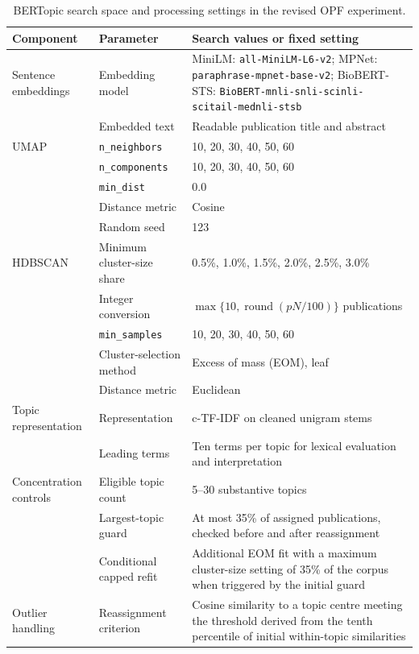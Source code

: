 \documentclass[a4paper,fleqn]{cas-sc}
\begin{document}
\begin{table}[htbp]
\centering
\caption{BERTopic search space and processing settings in the revised OPF experiment.}
\label{tab:opf_bertopic_parameters}
\scriptsize
\setlength{\tabcolsep}{4pt}
\renewcommand{\arraystretch}{1.15}
\begin{tabularx}{\textwidth}{p{27mm}p{38mm}X}
\toprule
Component & Parameter & Search values or fixed setting \\
\midrule
Sentence embeddings & Embedding model & MiniLM: \texttt{all-MiniLM-L6-v2}; MPNet: \texttt{paraphrase-mpnet-base-v2}; BioBERT-STS: \texttt{BioBERT-mnli-snli-scinli-scitail-mednli-stsb} \\
& Embedded text & Readable publication title and abstract \\
\midrule
UMAP & \texttt{n\_neighbors} & 10, 20, 30, 40, 50, 60 \\
& \texttt{n\_components} & 10, 20, 30, 40, 50, 60 \\
& \texttt{min\_dist} & 0.0 \\
& Distance metric & Cosine \\
& Random seed & 123 \\
\midrule
HDBSCAN & Minimum cluster-size share & 0.5\%, 1.0\%, 1.5\%, 2.0\%, 2.5\%, 3.0\% \\
& Integer conversion & $\max\{10,\operatorname{round}(pN/100)\}$ publications \\
& \texttt{min\_samples} & 10, 20, 30, 40, 50, 60 \\
& Cluster-selection method & Excess of mass (EOM), leaf \\
& Distance metric & Euclidean \\
\midrule
Topic representation & Representation & c-TF-IDF on cleaned unigram stems \\
& Leading terms & Ten terms per topic for lexical evaluation and interpretation \\
\midrule
Concentration controls & Eligible topic count & 5--30 substantive topics \\
& Largest-topic guard & At most 35\% of assigned publications, checked before and after reassignment \\
& Conditional capped refit & Additional EOM fit with a maximum cluster-size setting of 35\% of the corpus when triggered by the initial guard \\
\midrule
Outlier handling & Reassignment criterion & Cosine similarity to a topic centre meeting the threshold derived from the tenth percentile of initial within-topic similarities \\

\end{tabularx}
\end{table}
\end{document}
